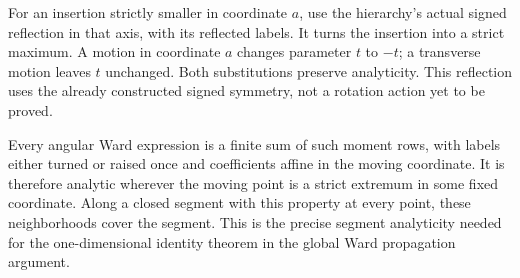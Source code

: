 For an insertion strictly smaller in coordinate $a$, use the hierarchy's
actual signed reflection in that axis, with its reflected labels. It
turns the insertion into a strict maximum. A motion in coordinate $a$
changes parameter $t$ to $-t$; a transverse motion leaves $t$ unchanged.
Both substitutions preserve analyticity. This reflection uses the already
constructed signed symmetry, not a rotation action yet to be proved.

Every angular Ward expression is a finite sum of such moment rows, with
labels either turned or raised once and coefficients affine in the moving
coordinate. It is therefore analytic wherever the moving point is a
strict extremum in some fixed coordinate. Along a closed segment with
this property at every point, these neighborhoods cover the segment.
This is the precise segment analyticity needed for the one-dimensional
identity theorem in the global Ward propagation argument.
